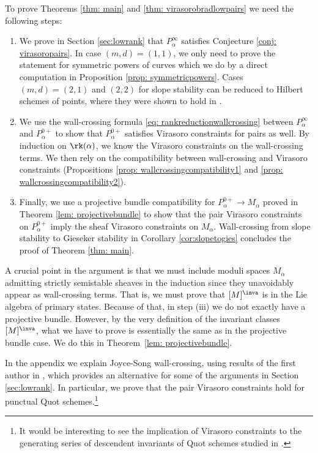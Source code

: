 To prove Theorems \ref{thm: main} and \ref{thm: virasorobradlowpairs} we need the following steps:
\begin{enumerate}
\item[(i)] We prove in Section \ref{sec:lowrank} that $P^{\infty}_\alpha$ satisfies Conjecture \ref{conj: virasoropairs}. In case $(m,d)=(1,1)$, we only need to prove the statement for symmetric powers of curves which we do by a direct computation in Proposition \ref{prop: symmetricpowers}. Cases $(m,d)=(2,1)$ and $(2,2)$ for slope stability can be reduced to Hilbert schemes of points, where they were shown to hold in \cite{moop,moreira}.
\item[(ii)] We use the wall-crossing formula \eqref{eq: rankreductionwallcrossing} between $P^{\infty}_\alpha$ and $P^{0+}_\alpha$ to show that $P^{0+}_\alpha$ satisfies Virasoro constraints for pairs as well. By induction on $\rk(\alpha)$, we know the Virasoro constraints on the wall-crossing terms. We then rely on the compatibility between wall-crossing and Virasoro constraints (Propositions \ref{prop: wallcrossingcompatibility1} and \ref{prop: wallcrossingcompatibility2}).
\item[(iii)]  Finally, we use a projective bundle compatibility for  $P^{0+}_\alpha\to M_\alpha$ proved in Theorem \ref{lem: projectivebundle} to show that the pair Virasoro constraints on $P^{0+}_\alpha$ imply the sheaf Virasoro constraints on $M_\alpha$.  Wall-crossing from slope stability to Gieseker stability in Corollary \ref{cor:slopetogies} concludes the proof of Theorem \ref{thm: main}.
\end{enumerate}
A crucial point in the argument is that we must include moduli spaces $M_\alpha$ admitting strictly semistable sheaves in the induction since they unavoidably appear as wall-crossing terms. That is, we must prove that $[M]^\inva$ is in the Lie algebra of primary states. Because of that, in step (iii) we do not exactly have a projective bundle. However, by the very definition of the invariant classes $[M]^\inva$, what we have to prove is essentially the same as in the projective bundle case. We do this in Theorem~\ref{lem: projectivebundle}.

In the appendix we explain Joyce-Song wall-crossing, using results of the first author in \cite{Bo21.5}, which provides an alternative for some of the arguments in Section \ref{sec:lowrank}. In particular, we prove that the pair Virasoro constraints hold for punctual Quot schemes.\footnote{It would be interesting to see the implication of Virasoro constraints to the generating series of descendent invariants of Quot schemes studied in \cite{JOP}.}

